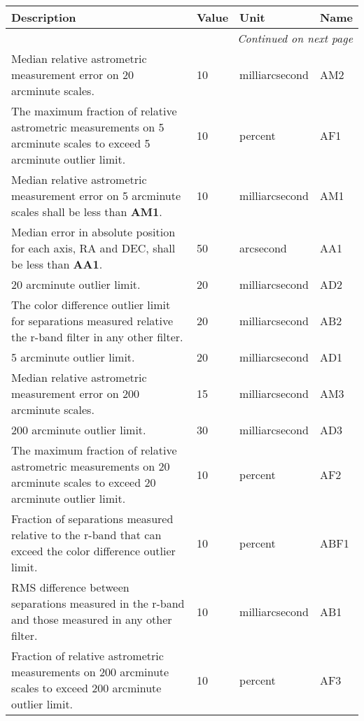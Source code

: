\documentclass[SE,toc,lsstdraft]{lsstdoc}
\makeatletter
\newcommand{\paramname}[1]{\hspace{0pt}#1}
\newcommand{\unitname}[1]{\hspace{0pt}#1}
\newenvironment{parameters}[0]{%
\setlength\LTleft{0pt}
\setlength\LTright{\fill}
\begin{small}
\begin{longtable}[]{|p{0.49\textwidth}|l|p{0.6in}|p{1.70in}@{}|}

\hline \textbf{Description} & \textbf{Value} & \textbf{Unit} & \textbf{Name} \\ \hline
\endhead

\hline \multicolumn{4}{r}{\emph{Continued on next page}} \\
\endfoot

\hline\hline
\endlastfoot
}{%
\hline
\end{longtable}
\end{small}
}
\makeatother
\begin{document}
\begin{parameters}
Median relative astrometric measurement error on 20 arcminute scales.

&
10
&
\unitname{%
milliarcsecond
}
&
\paramname{%
AM2
} \\\hline
The maximum fraction of relative astrometric measurements on 5 arcminute scales to exceed 5 arcminute outlier limit.
&
10
&
\unitname{%
percent
}
&
\paramname{%
AF1
} \\\hline
Median relative astrometric measurement error on 5 arcminute scales shall be less than \textbf{AM1}.

&
10
&
\unitname{%
milliarcsecond
}
&
\paramname{%
AM1
} \\\hline
    Median error in absolute position for each axis, RA and DEC, shall be less than \textbf{AA1}.
&
50
&
\unitname{%
arcsecond
}
&
\paramname{%
AA1
} \\\hline
20 arcminute outlier limit.

&
20
&
\unitname{%
milliarcsecond
}
&
\paramname{%
AD2
} \\\hline
The color difference outlier limit for separations measured relative the r-band filter in any other filter.
&
20
&
\unitname{%
milliarcsecond
}
&
\paramname{%
AB2
} \\\hline
5 arcminute outlier limit.
&
20
&
\unitname{%
milliarcsecond
}
&
\paramname{%
AD1
} \\\hline
Median relative astrometric measurement error on 200 arcminute scales.

&
15
&
\unitname{%
milliarcsecond
}
&
\paramname{%
AM3
} \\\hline
200 arcminute outlier limit.

&
30
&
\unitname{%
milliarcsecond
}
&
\paramname{%
AD3
} \\\hline
The maximum fraction of relative astrometric measurements on 20 arcminute scales to exceed 20 arcminute outlier limit.
&
10
&
\unitname{%
percent
}
&
\paramname{%
AF2
} \\\hline
Fraction of separations measured relative to the r-band that can exceed the color difference outlier limit.

&
10
&
\unitname{%
percent
}
&
\paramname{%
ABF1
} \\\hline
RMS difference between separations measured in the r-band and those measured in any other filter.

&
10
&
\unitname{%
milliarcsecond
}
&
\paramname{%
AB1
} \\\hline
Fraction of relative astrometric measurements on 200 arcminute scales to exceed 200 arcminute outlier limit.
&
10
&
\unitname{%
percent
}
&
\paramname{%
AF3
} \\\hline
\end{parameters}
\end{document}

